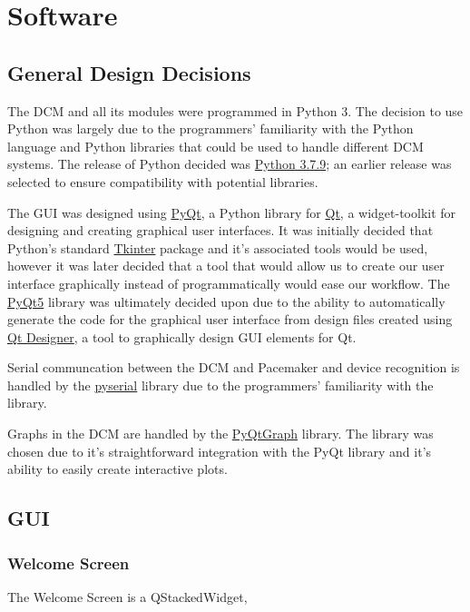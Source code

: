 \documentclass[12pt]{article}
\begin{document}
\newpage
\section{Software}
\subsection{General Design Decisions}
The DCM and all its modules were programmed in Python 3. The decision to use Python was largely due to the programmers' familiarity with the Python language and Python libraries that could be used to handle different DCM systems. The release of Python decided was \href{https://www.python.org/downloads/release/python-379/}{Python 3.7.9}; an earlier release was selected to ensure compatibility with potential libraries.

The GUI was designed using \href{https://riverbankcomputing.com/software/pyqt/intro}{PyQt}, a Python library for \href{https://www.qt.io/}{Qt}, a widget-toolkit for designing and creating graphical user interfaces. It was initially decided that Python's standard \href{https://docs.python.org/3/library/tkinter.html}{Tkinter} package and it's associated tools would be used, however it was later decided that a tool that would allow us to create our user interface graphically instead of programmatically would ease our workflow. The \href{https://pypi.org/project/PyQt5/}{PyQt5} library was ultimately decided upon due to the ability to automatically generate the code for the graphical user interface from design files created using \href{https://doc.qt.io/qt-5/qtdesigner-manual.html}{Qt Designer}, a tool to graphically design GUI elements for Qt.

Serial communcation between the DCM and Pacemaker and device recognition is handled by the \href{https://pypi.org/project/pyserial/}{pyserial} library due to the programmers' familiarity with the library.

Graphs in the DCM are handled by the \href{http://www.pyqtgraph.org/}{PyQtGraph} library. The library was chosen due to it's straightforward integration with the PyQt library and it's ability to easily create interactive plots.

\subsection{GUI}
\subsubsection{Welcome Screen}
The Welcome Screen is a QStackedWidget, 
\end{document}
